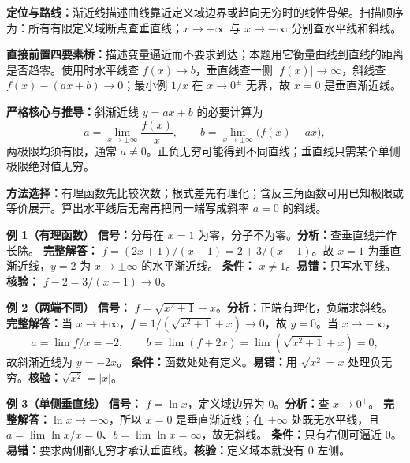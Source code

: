 
\par

\begin{knowledgeBox}
\textbf{定位与路线：}渐近线描述曲线靠近定义域边界或趋向无穷时的线性骨架。扫描顺序为：所有有限定义域断点查垂直线；\(x\to+\infty\) 与 \(x\to-\infty\) 分别查水平线和斜线。

\textbf{直接前置四要素桥：}描述变量逼近而不要求到达；本题用它衡量曲线到直线的距离是否趋零。使用时水平线查 \(f(x)\to b\)，垂直线查一侧 \(|f(x)|\to\infty\)，斜线查 \(f(x)-(ax+b)\to0\)；最小例 \(1/x\) 在 \(x\to0^\pm\) 无界，故 \(x=0\) 是垂直渐近线。

\textbf{严格核心与推导：}斜渐近线 \(y=ax+b\) 的必要计算为
\[
a=\lim_{x\to\pm\infty}\frac{f(x)}x,\qquad
b=\lim_{x\to\pm\infty}\bigl(f(x)-ax\bigr),
\]
两极限均须有限，通常 \(a\ne0\)。正负无穷可能得到不同直线；垂直线只需某个单侧极限绝对值无穷。

\textbf{方法选择：}有理函数先比较次数；根式差先有理化；含反三角函数可用已知极限或等价展开。算出水平线后无需再把同一端写成斜率 \(a=0\) 的斜线。

\textbf{例 1（有理函数）}\quad
\textbf{信号：}分母在 \(x=1\) 为零，分子不为零。\textbf{分析：}查垂直线并作长除。
\textbf{完整解答：} \(f=(2x+1)/(x-1)=2+3/(x-1)\)。故 \(x=1\) 为垂直渐近线，\(y=2\) 为 \(x\to\pm\infty\) 的水平渐近线。
\textbf{条件：} \(x\ne1\)。\textbf{易错：}只写水平线。\textbf{核验：} \(f-2=3/(x-1)\to0\)。

\textbf{例 2（两端不同）}\quad
\textbf{信号：} \(f=\sqrt{x^2+1}-x\)。\textbf{分析：}正端有理化，负端求斜线。
\textbf{完整解答：}当 \(x\to+\infty\)，\(f=1/(\sqrt{x^2+1}+x)\to0\)，故 \(y=0\)。当 \(x\to-\infty\)，
\[
a=\lim f/x=-2,\qquad b=\lim(f+2x)=\lim(\sqrt{x^2+1}+x)=0,
\]
故斜渐近线为 \(y=-2x\)。
\textbf{条件：}函数处处有定义。\textbf{易错：}用 \(\sqrt{x^2}=x\) 处理负无穷。\textbf{核验：}\(\sqrt{x^2}=|x|\)。

\textbf{例 3（单侧垂直线）}\quad
\textbf{信号：} \(f=\ln x\)，定义域边界为 \(0\)。\textbf{分析：}查 \(x\to0^+\)。
\textbf{完整解答：}\(\ln x\to-\infty\)，所以 \(x=0\) 是垂直渐近线；在 \(+\infty\) 处既无水平线，且 \(a=\lim\ln x/x=0\)、\(b=\lim\ln x=\infty\)，故无斜线。
\textbf{条件：}只有右侧可逼近 \(0\)。\textbf{易错：}要求两侧都无穷才承认垂直线。\textbf{核验：}定义域本就没有 \(0\) 左侧。


\end{knowledgeBox}
